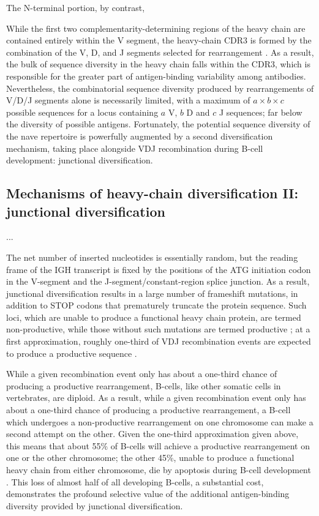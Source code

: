 The N-terminal portion, by contrast, 

While the first two complementarity-determining regions of the heavy chain are contained entirely within the V segment, the heavy-chain CDR3 is formed by the combination of the V, D, and J segments selected for rearrangement \citep{jung2006vdjr}. As a result, the bulk of sequence diversity in the heavy chain falls within the CDR3, which is responsible for the greater part of antigen-binding variability among antibodies. %
Nevertheless, the combinatorial sequence diversity produced by rearrangements of V/D/J segments alone is necessarily limited, with a maximum of $a \times b \times c$ possible sequences for a locus containing $a$ V, $b$ D and $c$ J sequences; far below the diversity of possible antigens. %
Fortunately, the potential sequence diversity of the nave repertoire is powerfully augmented by a second diversification mechanism, taking place alongside VDJ recombination during B-cell development: junctional diversification.

\subsection{Mechanisms of heavy-chain diversification II: junctional diversification}

...

The net number of inserted nucleotides is essentially random, but the reading frame of the IGH transcript is fixed by the positions of the ATG initiation codon in the V-segment and the J-segment/constant-region splice junction. As a result, junctional diversification results in a large number of frameshift mutations, in addition to STOP codons that prematurely truncate the protein sequence. %
Such loci, which are unable to produce a functional heavy chain protein, are termed non-productive, while those without such mutations are termed productive ; at a first approximation, roughly one-third of VDJ recombination events are expected to produce a productive sequence \citep{jung2006vdjr}. %

While a given recombination event only has about a one-third chance of producing a productive rearrangement, B-cells, like other somatic cells in vertebrates, are diploid. As a result, while a given recombination event only has about a one-third chance of producing a productive rearrangement, a B-cell which undergoes a non-productive rearrangement on one chromosome can make a second attempt on the other. Given the one-third approximation given above, this means that about 55\% of B-cells will achieve a productive rearrangement on one or the other chromosome; the other 45\%, unable to produce a functional heavy chain from either chromosome, die by apoptosis during B-cell development \citep{jung2006vdjr}. %
This loss of almost half of all developing B-cells, a substantial cost, demonstrates the profound selective value of the additional antigen-binding diversity provided by junctional diversification.

